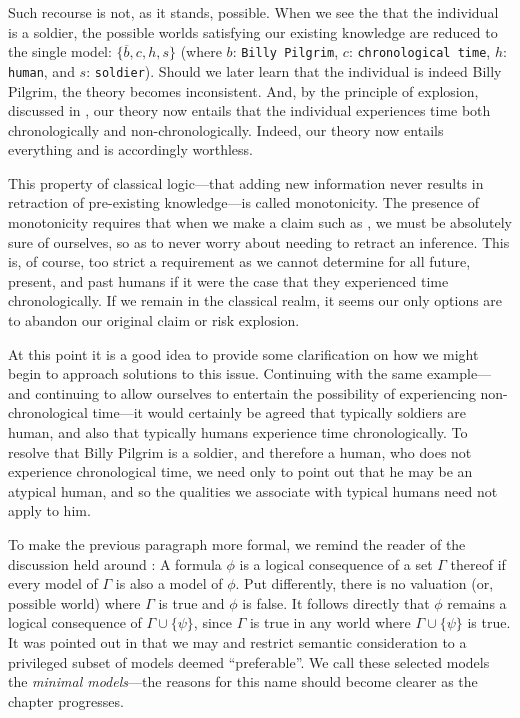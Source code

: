 Such recourse is not, as it stands, possible. When we see the that the individual is a soldier, the possible worlds
satisfying our existing knowledge are reduced to the single model: $\{\overline{b},c, h,s\}$ (where $b$: \texttt{Billy
Pilgrim}, $c$: \texttt{chronological time}, $h$: \texttt{human}, and $s$: \texttt{soldier}). Should we later learn that the
individual is indeed Billy Pilgrim, the theory becomes inconsistent.
And, by the principle of explosion, discussed in , our theory now entails that the
individual experiences time both chronologically and non-chronologically. Indeed, our theory now entails everything and
is accordingly worthless.

This property of classical logic---that adding new information never results in retraction of pre-existing knowledge---is
called monotonicity. The presence of monotonicity requires that when we make a claim such as ,
we must be absolutely sure of ourselves, so as to never worry about needing to retract an inference. This is, of course,
too strict a requirement as we cannot determine for all future, present, and past humans if it were the case that they experienced
time chronologically. If we remain in the classical realm, it seems our only options are to abandon our original claim or
risk explosion.

At this point it is a good idea to provide some clarification on how we might begin to approach solutions to this issue.
Continuing with the same example---and continuing to allow ourselves to entertain the possibility of experiencing non-chronological
time---it would certainly be agreed that typically soldiers are human, and also that typically humans experience time chronologically.
To resolve that Billy Pilgrim is a soldier, and therefore a human, who does not experience chronological time, we need only
to point out that he may be an atypical human, and so the qualities we associate with typical humans need not apply to
him.

To make the previous paragraph more formal, we remind the reader of the discussion held around :
A formula $\phi$ is a logical consequence of a set $\Gamma$ thereof if every model of $\Gamma$ is also a model of $\phi$.
Put differently, there is no valuation (or, possible world) where $\Gamma$ is true and $\phi$ is false. It follows
directly that $\phi$ remains a logical consequence of $\Gamma \cup \{\psi\}$, since $\Gamma$ is true in any world where $\Gamma
\cup \{\psi\}$ is true. It was pointed out in \cite{shohamSemanticApproach} that we may  and restrict
semantic consideration to a privileged subset of models deemed ``preferable''. We call these selected models the \textit{minimal
models}---the reasons for this name should become clearer as the chapter progresses.

